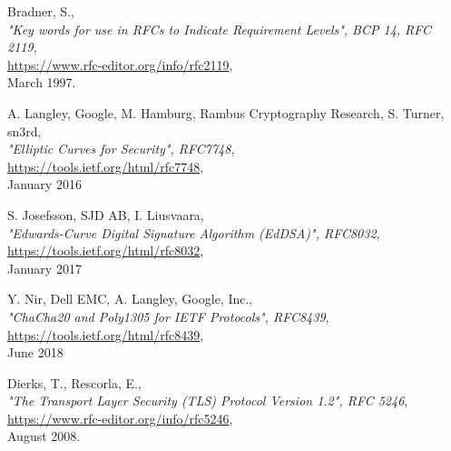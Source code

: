 \documentclass[10pt]{article}
\begin{document}
\begin{thebibliography}{XXXXXXX}


  Bradner, S.,\\
  \emph{"Key words for use in RFCs to Indicate Requirement Levels", BCP 14, RFC 2119},\\
  \url{https://www.rfc-editor.org/info/rfc2119},\\
  March 1997.

  A. Langley, Google, M. Hamburg, Rambus Cryptography Research, S. Turner, sn3rd,\\
  \emph{"Elliptic Curves for Security", RFC7748},\\
  \url{https://tools.ietf.org/html/rfc7748},\\
  January 2016

  S. Josefsson, SJD AB, I. Liusvaara,\\
  \emph{"Edwards-Curve Digital Signature Algorithm (EdDSA)", RFC8032},\\
  \url{https://tools.ietf.org/html/rfc8032},\\
  January 2017

  Y. Nir, Dell EMC, A. Langley, Google, Inc.,\\
  \emph{"ChaCha20 and Poly1305 for IETF Protocols", RFC8439},\\
  \url{https://tools.ietf.org/html/rfc8439},\\
  June 2018


  Dierks, T., Rescorla, E.,\\
  \emph{"The Transport Layer Security (TLS) Protocol Version 1.2", RFC 5246},\\
  \url{https://www.rfc-editor.org/info/rfc5246},\\
  August 2008.

\end{thebibliography}
\end{document}

